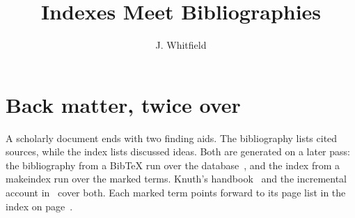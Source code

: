 \documentclass[11pt,notitlepage]{report}
\title{Indexes Meet Bibliographies}
\author{J. Whitfield}
\date{}
\begin{document}
\maketitle

\section{Back matter, twice over}
\label{sec:backmatter}

A scholarly document ends with two finding aids. The
bibliography lists cited sources, while the
index lists discussed ideas. Both are generated on a later
pass: the bibliography from a BibTeX run over the
database~\cite{plass81,knuth84}, and the index from a
makeindex run over the marked terms. Knuth's
handbook~\cite{knuth84} and the incremental account
in~\cite{adapton} cover both. Each marked term points forward to its page
list in the index on page~\pageref{ch:index}.




\label{ch:index}
\printindex
\end{document}
